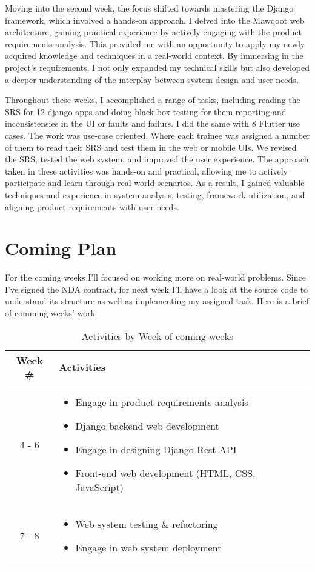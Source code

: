 \documentclass{article}
\begin{document}
Moving into the second week, the focus shifted towards mastering the Django framework, which involved a hands-on approach. I delved into the Mawqoot web architecture, gaining practical experience by actively engaging with the product requirements analysis. This provided me with an opportunity to apply my newly acquired knowledge and techniques in a real-world context. By immersing in the project's requirements, I not only expanded my technical skills but also developed a deeper understanding of the interplay between system design and user needs.
\newline

Throughout these weeks, I accomplished a range of tasks, including reading the SRS for 12 django apps and doing black-box testing for them reporting and inconsistensies in the UI or faults and failurs. I did the same with 8 Flutter use cases. The work was use-case oriented. Where each trainee was assigned a number of them to read their SRS and test them in the web or mobile UIs. We revised the SRS, tested the web system, and improved the user experience. The approach taken in these activities was hands-on and practical, allowing me to actively participate and learn through real-world scenarios. As a result, I gained valuable techniques and experience in system analysis, testing, framework utilization, and aligning product requirements with user needs.


\section{Coming Plan}

For the coming weeks I'll focused on working more on real-world problems. Since I've signed the NDA contract, for next week I'll have a look at the source code to understand its structure as well as implementing my assigned task. Here is a brief of comming weeks' work

\begin{table}[h]
  \centering
  \caption{Activities by Week of coming weeks}

  \begin{tabular}{|c|p{10cm}|}
    \hline
    \textbf{Week \#} & \textbf{Activities}           \\
    \hline
    4 - 6            & \begin{itemize}
      \item Engage in product requirements analysis
      \item Django backend web development
      \item Engage in designing Django Rest API
      \item Front-end web development (HTML, CSS, JavaScript)
    \end{itemize} \\
    \hline
    7 - 8            & \begin{itemize}
      \item Web system testing \& refactoring
      \item Engage in web system deployment
    \end{itemize} \\
    \hline
  \end{tabular}
\end{table}
\end{document}

